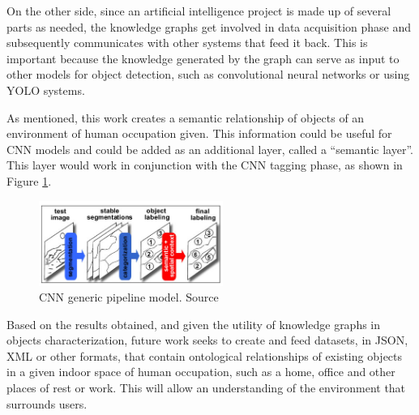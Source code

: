 On the other side, since an artificial intelligence project is made up of 
several parts as needed, the knowledge graphs get involved in 
data acquisition phase and subsequently communicates with other 
systems that feed it back. This is important because the knowledge generated by 
the graph can serve as input to other models for object detection, such as 
convolutional neural networks or using YOLO systems.

As mentioned, this work creates a semantic relationship of objects of an 
environment of human occupation given. This information could be useful for 
CNN models and could be added as an additional layer, called a 
``semantic layer''. This layer would work in conjunction with the CNN 
tagging phase, as shown in Figure \ref{fig:pipeline}.

\begin{figure}[H]
    \centering
    \includegraphics[width=6cm]{figures/pipeline.png}
    \caption{CNN generic pipeline model. Source \cite{Galleguillos2}}
    \label{fig:pipeline}
\end{figure}


Based on the results obtained, and given the utility of knowledge graphs 
in objects characterization, future work seeks to create and feed 
datasets, in JSON, XML or other formats, that contain ontological relationships 
of existing objects in a given indoor space of human occupation, such as a home, 
office and other places of rest or work. This will allow an understanding of 
the environment that surrounds users.

